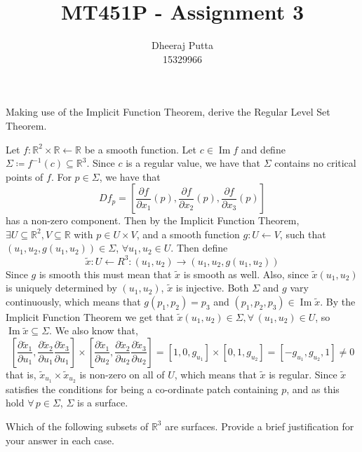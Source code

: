 \documentclass[12pt, answers]{exam}
\title{MT451P - Assignment 3}
\author{Dheeraj Putta \\ 15329966}
\date{}
\DeclareMathOperator{\im}{Im}
\begin{document}
    \maketitle
    \begin{questions}
        \thispagestyle{foot}

        \question Making use of the Implicit Function Theorem, derive the Regular Level Set Theorem.
        \begin{solution}
            Let $f : \mathbb{R}^2 \times \mathbb{R} \leftarrow \mathbb{R}$ be a smooth function. Let $c \in \im f$ and define
            $\Sigma \coloneqq f^{-1}(c) \subseteq \mathbb{R}^3$. Since $c$ is a regular value, we have that $\Sigma$ contains
            no critical points of $f$. For $p \in \Sigma$, we have that
            \[ Df_p = \left[\frac{\partial f}{\partial x_1}(p), \frac{\partial f}{\partial x_2}(p), \frac{\partial f}{\partial x_3}(p)\right] \]
            has a non-zero component. Then by the Implicit Function Theorem, $\exists U \subseteq \mathbb{R}^2, V \subseteq \mathbb{R}$
            with $p \in U \times V$, and a smooth function $g:U \leftarrow V$, such that $(u_1, u_2, g(u_1, u_2)) \in \Sigma$,
            $\forall u_1, u_2 \in U$. Then define
            \[ \tilde{x}: U \leftarrow R^3 :  (u_1, u_2) \to (u_1, u_2, g(u_1, u_2))\]
            Since $g$ is smooth this must mean that $\tilde{x}$ is smooth as well. Also, since $\tilde{x}(u_1, u_2)$ is
            uniquely determined by $(u_1, u_2)$, $\tilde{x}$ is injective. Both $\Sigma$ and $g$ vary continuously, which
            means that $g(p_1, p_2) = p_3$ and $(p_1, p_2, p_3) \in \im \tilde{x}$. By the Implicit Function Theorem we
            get that $\tilde{x}(u_1, u_2) \in \Sigma, \forall \, (u_1, u_2) \in U$, so $\im \tilde{x} \subseteq \Sigma$.
            We also know that,
            \[ \left[ \frac{\partial\tilde{x}_1}{\partial u_1}, \frac{\partial\tilde{x}_2}{\partial u_1}  \frac{\partial\tilde{x}_3}{\partial u_1}\right]
            \times \left[ \frac{\partial\tilde{x}_1}{\partial u_2}, \frac{\partial\tilde{x}_2}{\partial u_2}  \frac{\partial\tilde{x}_3}{\partial u_2}\right]
             = [1, 0, g_{u_1}] \times [0, 1, g_{u_2}] = [-g_{u_1}, g_{u_2}, 1] \neq 0\]
            that is, $\tilde{x}_{u_1} \times \tilde{x}_{u_2}$ is non-zero on all of $U$, which means that $\tilde{x}$ is
            regular. Since $\tilde{x}$ satisfies the conditions for being a co-ordinate patch containing $p$, and as this
            hold $\forall \, p \in \Sigma$, $\Sigma$ is a surface.
        \end{solution}
        \pagebreak
        \question Which of the following subsets of $\mathbb{R}^3$ are surfaces. Provide a brief justification for your answer in
        each case.


\end{questions}
\end{document}
